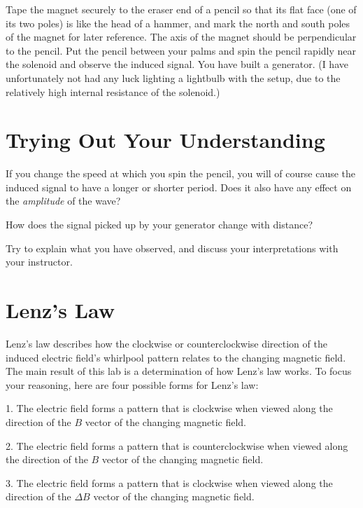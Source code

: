 
Tape the magnet securely to the eraser end of a pencil so
that its flat face (one of its two poles) is like the head
of a hammer, and mark the north and south poles of the
magnet for later reference. The axis of the magnet should be
perpendicular to the pencil. Put the pencil between your palms and spin the pencil rapidly near the
solenoid and observe the induced signal. You have built a
generator. (I have unfortunately not had any luck lighting a
lightbulb with the setup, due to the relatively high
internal resistance of the solenoid.)

\section*{Trying Out Your Understanding}


If you change the speed at which you spin the pencil, you
will of course cause the induced signal to have a longer or
shorter period. Does it also have any effect on the
\emph{amplitude} of the wave?


How does the signal picked up by your generator change with distance?

Try to explain what you have observed, and discuss your
interpretations with your instructor.

\section*{Lenz's Law}

Lenz's law describes how the clockwise or counterclockwise
direction of the induced electric field's whirl\-pool pattern
relates to the changing magnetic field. The main result of
this lab is a determination of how Lenz's law works. To
focus your reasoning, here are four possible forms for Lenz's law:

1. The electric field forms a pattern that is clockwise when
viewed along the direction of the $B$ vector of the
changing magnetic field.

2. The electric field forms a pattern that is counterclockwise
when viewed along the direction of the $B$ vector of the
changing magnetic field.

3. The electric field forms a pattern that is clockwise when
viewed along the direction of the $\Delta B$ vector of the
changing magnetic field.

